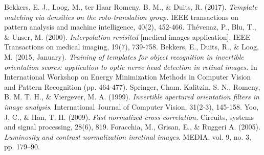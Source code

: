 \documentclass{article}
\begin{document}
\begin{thebibliography}{9}

    Bekkers, E. J., Loog, M., ter Haar Romeny, B. M., \& Duits, R. (2017).
    \emph{Template matching via densities on the roto-translation group.}
    IEEE transactions on pattern analysis and machine intelligence, 40(2), 452-466.
    Thévenaz, P., Blu, T., \& Unser, M. (2000). \emph{Interpolation revisited} [medical
    images application]. IEEE Transactions on medical imaging, 19(7), 739-758.
    Bekkers, E., Duits, R., \& Loog, M. (2015, January). \emph{Training of templates for
      object recognition in invertible orientation scores: application to optic nerve
    head detection in retinal images.}
    In International Workshop on Energy Minimization Methods in Computer Vision and Pattern Recognition (pp. 464-477). Springer, Cham.
    Kalitzin, S. N., Romeny, B. M. T. H., \& Viergever, M. A. (1999).
    \emph{Invertible apertured orientation filters in image analysis.}
    International Journal of Computer Vision, 31(2-3), 145-158.
    Yoo, J. C., \& Han, T. H. (2009).
    \emph{Fast normalized cross-correlation.} Circuits, systems and signal processing, 28(6), 819.
    Foracchia, M., Grisan, E., \& Ruggeri A. (2005). \emph{Luminosity  and  contrast  normalization  inretinal images}.
    MEDIA, vol. 9, no. 3, pp. 179–90.
\end{thebibliography}

        
\end{document}
